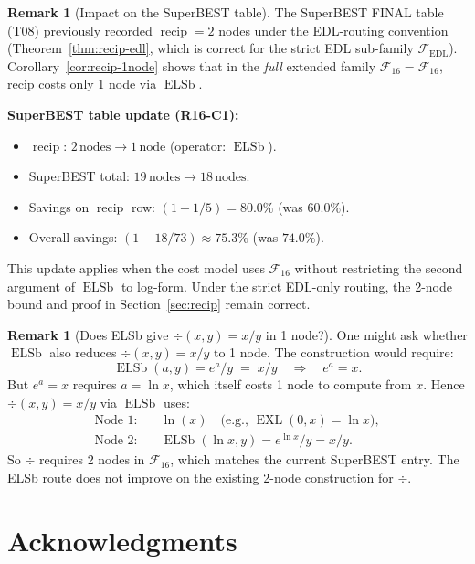 \documentclass[12pt,a4paper]{article}
\theoremstyle{definition}
\newtheorem{remark}[theorem]{Remark}
\newcommand{\EXL}{\operatorname{EXL}}
\newcommand{\ELSb}{\operatorname{ELSb}}
\newcommand{\F}{\mathcal{F}_{16}}
\newcommand{\recip}{\operatorname{recip}}
\begin{document}
\begin{remark}[Impact on the SuperBEST table]\label{rem:superbest-update}
The SuperBEST FINAL table (T08) previously recorded $\recip = 2$ nodes under
the EDL-routing convention (Theorem~\ref{thm:recip-edl}, which is correct for the
strict EDL sub-family $\mathcal{F}_{\mathrm{EDL}}$).
Corollary~\ref{cor:recip-1node} shows that in the \emph{full} extended family
$\F = \mathcal{F}_{16}$, recip costs only 1 node via $\ELSb$.

\medskip
\noindent\textbf{SuperBEST table update (R16-C1):}
\begin{itemize}
  \item $\recip$: $2\,\text{nodes} \to 1\,\text{node}$ (operator: $\ELSb$).
  \item SuperBEST total: $19\,\text{nodes} \to 18\,\text{nodes}$.
  \item Savings on $\recip$ row: $(1 - 1/5) = 80.0\%$ (was $60.0\%$).
  \item Overall savings: $(1 - 18/73) \approx 75.3\%$ (was $74.0\%$).
\end{itemize}

This update applies when the cost model uses $\mathcal{F}_{16}$ without
restricting the second argument of $\ELSb$ to log-form.  Under the strict
EDL-only routing, the 2-node bound and proof in Section~\ref{sec:recip} remain correct.
\end{remark}

\begin{remark}[Does ELSb give $\div(x,y) = x/y$ in 1 node?]\label{rem:div-1node}
One might ask whether $\ELSb$ also reduces $\div(x,y) = x/y$ to 1 node.
The construction would require:
\[
  \ELSb(a, y) = e^a / y \;=\; x/y \quad\Longrightarrow\quad e^a = x.
\]
But $e^a = x$ requires $a = \ln x$, which itself costs 1 node to compute from $x$.
Hence $\div(x,y) = x/y$ via $\ELSb$ uses:
\begin{align*}
  \text{Node 1:}\quad & \ln(x) \quad\text{(e.g., $\EXL(0, x) = \ln x$)},\\
  \text{Node 2:}\quad & \ELSb(\ln x, y) = e^{\ln x}/y = x/y.
\end{align*}
So $\div$ requires 2 nodes in $\F$, which matches the current SuperBEST entry.
The ELSb route does not improve on the existing 2-node construction for $\div$.
\end{remark}

\section*{Acknowledgments}
\end{document}
